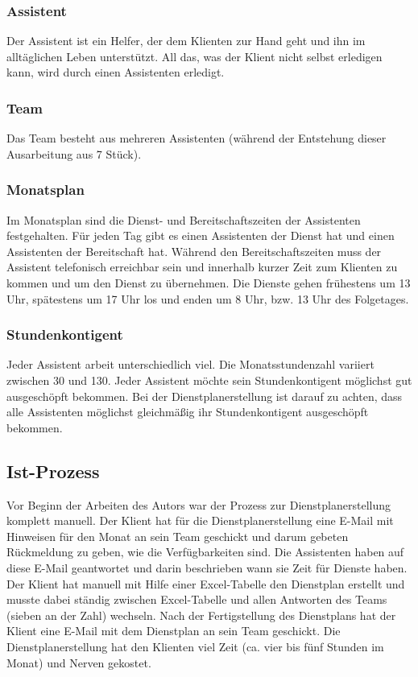\documentclass[12pt,a4paper,titlepage]{article} %
\begin{document}
\subsubsection{Assistent}
Der Assistent ist ein Helfer, der dem Klienten zur Hand geht und ihn im alltäglichen Leben unterstützt. All das, was der Klient nicht selbst erledigen kann, wird durch einen Assistenten erledigt.

\subsubsection{Team}
Das Team besteht aus mehreren Assistenten (während der Entstehung dieser Ausarbeitung aus 7 Stück).

\subsubsection{Monatsplan}
Im Monatsplan sind die Dienst- und Bereitschaftszeiten der Assistenten festgehalten. Für jeden Tag gibt es einen Assistenten der Dienst hat und einen Assistenten der Bereitschaft hat. Während den Bereitschaftszeiten muss der Assistent telefonisch erreichbar sein und innerhalb kurzer Zeit zum Klienten zu kommen und um den Dienst zu übernehmen. Die Dienste gehen frühestens um 13 Uhr, spätestens um 17 Uhr los und enden um 8 Uhr, bzw. 13 Uhr des Folgetages. 

\subsubsection{Stundenkontigent}
Jeder Assistent arbeit unterschiedlich viel. Die Monatsstundenzahl variiert zwischen 30 und 130. Jeder Assistent möchte sein Stundenkontigent möglichst gut ausgeschöpft bekommen. Bei der Dienstplanerstellung ist darauf zu achten, dass alle Assistenten möglichst gleichmäßig ihr Stundenkontigent ausgeschöpft bekommen. %

\subsection{Ist-Prozess}
Vor Beginn der Arbeiten des Autors war der Prozess zur Dienstplanerstellung komplett manuell. Der Klient hat für die Dienstplanerstellung eine E-Mail mit Hinweisen für den Monat an sein Team geschickt und darum gebeten Rückmeldung zu geben, wie die Verfügbarkeiten sind.
Die Assistenten haben auf diese E-Mail geantwortet und darin beschrieben wann sie Zeit für Dienste haben.
Der Klient hat manuell mit Hilfe einer Excel-Tabelle den Dienstplan erstellt und musste dabei ständig zwischen Excel-Tabelle und allen Antworten des Teams (sieben an der Zahl) wechseln. Nach der Fertigstellung des Dienstplans hat der Klient eine E-Mail mit dem Dienstplan an sein Team geschickt.
Die Dienstplanerstellung hat den Klienten viel Zeit (ca. vier bis fünf Stunden im Monat) und Nerven gekostet.
\end{document}
